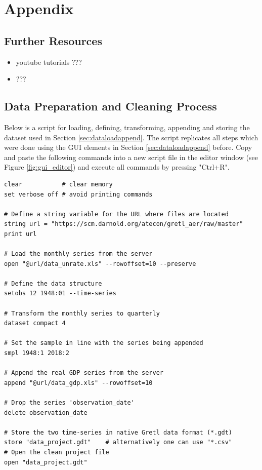 \documentclass[11pt]{article}
\newcommand{\remph}[1]{{\color{myred}#1}}
\begin{document}
\section{Appendix}

\subsection{Further Resources}
\remph{
\begin{itemize}
	\item youtube tutorials ???
	\item ???
\end{itemize}
}



\subsection{Data Preparation and Cleaning Process}
\label{sec:datapre}
Below is a script for loading, defining, transforming, appending and storing the dataset used in Section \ref{sec:dataloadappend}. The script replicates all steps which were done using the GUI elements in Section \ref{sec:dataloadappend} before. Copy and paste the following commands into a new script file in the editor window (see Figure \ref{fig:gui_editor}) and execute all commands by pressing "Ctrl+R".

\begin{Verbatim}[baselinestretch=0.75, frame=single, fontsize=\small]
clear			# clear memory
set verbose off	# avoid printing commands

# Define a string variable for the URL where files are located
string url = "https://scm.darnold.org/atecon/gretl_aer/raw/master"
print url

# Load the monthly series from the server
open "@url/data_unrate.xls" --rowoffset=10 --preserve

# Define the data structure
setobs 12 1948:01 --time-series

# Transform the monthly series to quarterly
dataset compact 4

# Set the sample in line with the series being appended
smpl 1948:1 2018:2

# Append the real GDP series from the server
append "@url/data_gdp.xls" --rowoffset=10

# Drop the series 'observation_date'
delete observation_date

# Store the two time-series in native Gretl data format (*.gdt)
store "data_project.gdt"	# alternatively one can use "*.csv"
# Open the clean project file
open "data_project.gdt"
\end{Verbatim}
\end{document}

